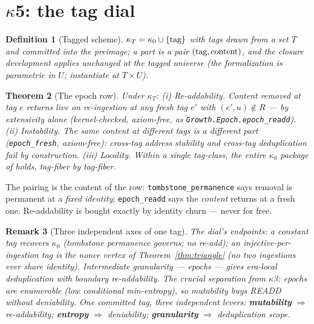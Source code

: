 \documentclass[10pt]{article}
\newtheorem{theorem}{Theorem}
\newtheorem{definition}[theorem]{Definition}
\newtheorem{remark}[theorem]{Remark}
\newcommand{\kz}{\kappa_0}
\begin{document}
\section{$\kappa$5: the tag dial}\label{sec:dial}

\begin{definition}[Tagged scheme]\label{def:tagged}
$\kappa_T = \kz \cup \{\textnormal{tag}\}$ with tags drawn from a set $T$ and committed into the preimage; a part is a pair $(\textnormal{tag}, \textnormal{content})$, and the closure development applies unchanged at the tagged universe (the formalization is parametric in $U$; instantiate at $T \times U$).
\end{definition}

\begin{theorem}[The epoch row]\label{thm:epoch}
Under $\kappa_T$: \emph{(i) Re-addability.} Content removed at tag $e$ returns live on re-ingestion at any fresh tag $e'$ with $(e',u) \notin R$ --- by extensivity alone (kernel-checked, \emph{axiom-free}, as \texttt{Growth.Epoch.epoch\_readd}). \emph{(ii) Instability.} The same content at different tags is a different part (\texttt{epoch\_fresh}, axiom-free): cross-tag address stability and cross-tag deduplication fail by construction. \emph{(iii) Locality.} Within a single tag-class, the entire $\kz$ package of \cite{growth,deletion} holds, tag-fiber by tag-fiber.
\end{theorem}

The pairing is the content of the row: \texttt{tombstone\_permanence} \cite{deletion} says removal is permanent at a \emph{fixed identity}; \texttt{epoch\_readd} says the \emph{content} returns at a fresh one. Re-addability is bought exactly by identity churn --- never for free.

\begin{remark}[Three independent axes of one tag]\label{rem:axes}
The dial's endpoints: a constant tag recovers $\kz$ (tombstone permanence governs; no re-add); an injective-per-ingestion tag is the nonce vertex of Theorem~\ref{thm:triangle} (no two ingestions ever share identity). Intermediate granularity --- epochs --- gives era-local deduplication with boundary re-addability. The crucial separation from $\kappa$3: epochs are \emph{enumerable} (low conditional min-entropy), so mutability buys READD \emph{without} deniability. One committed tag, three independent levers: \textbf{mutability} $\Rightarrow$ re-addability; \textbf{entropy} $\Rightarrow$ deniability; \textbf{granularity} $\Rightarrow$ deduplication scope.
\end{remark}
\end{document}
